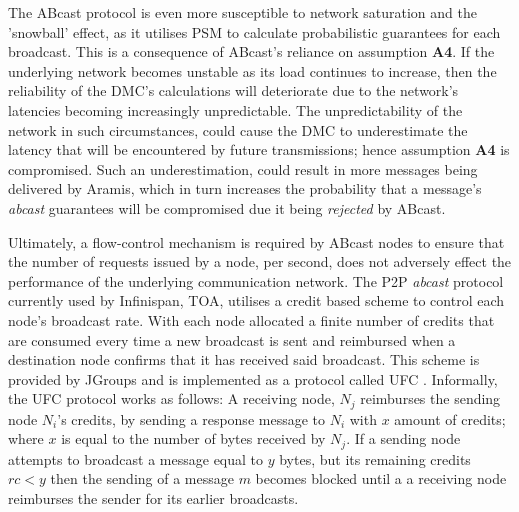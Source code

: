The \textsf{ABcast} protocol is even more susceptible to network saturation and the 'snowball' effect, as it utilises PSM to calculate probabilistic guarantees for each broadcast. This is a consequence of \textsf{ABcast}'s reliance on assumption \textbf{A4}.  If the underlying network becomes unstable as its load continues to increase, then the reliability of the DMC's calculations will deteriorate due to the network's latencies becoming increasingly unpredictable.  The unpredictability of the network in such circumstances, could cause the DMC to underestimate the latency that will be encountered by future transmissions; hence assumption \textbf{A4} is compromised.  Such an underestimation, could result in more messages being delivered by \textsf{Aramis}, which in turn increases the probability that a message's \emph{abcast} guarantees will be compromised due it being \emph{rejected} by \textsf{ABcast}.  

Ultimately, a flow-control mechanism is required by \textsf{ABcast} nodes to ensure that the number of requests issued by a node, per second, does not adversely effect the performance of the underlying communication network.  The P2P \emph{abcast} protocol currently used by Infinispan, TOA, utilises a credit based scheme to control each node's broadcast rate.  With each node allocated a finite number of credits that are consumed every time a new broadcast is sent and reimbursed when a destination node confirms that it has received said broadcast.  This scheme is provided by JGroups and is implemented as a protocol called \textsf{UFC} \citep{JGroupsUFC}.  Informally, the \textsf{UFC} protocol works as follows: A receiving node, $N_j$ reimburses the sending node $N_i$'s credits, by sending a response message to $N_i$ with $x$ amount of credits; where $x$ is equal to the number of bytes received by $N_j$.  If a sending node  attempts to broadcast a message equal to $y$ bytes, but its remaining credits $rc < y$ then the sending of a message $m$ becomes blocked until a a receiving node reimburses the sender for its earlier broadcasts.  

